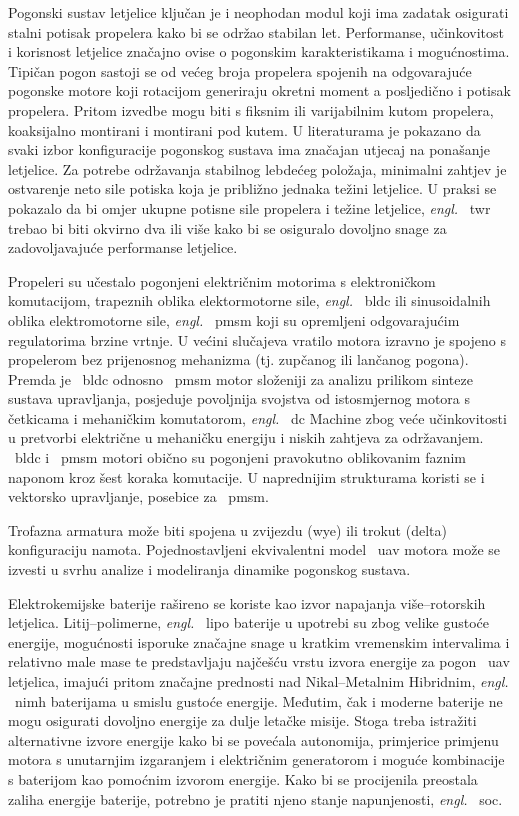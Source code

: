 \begin{prosirenisazetak}
	Pogonski sustav letjelice ključan je i neophodan modul koji ima zadatak osigurati stalni potisak propelera kako bi se održao stabilan let. Performanse, učinkovitost i korisnost letjelice značajno ovise o pogonskim karakteristikama i mogućnostima. Tipičan pogon sastoji se od većeg broja propelera spojenih na odgovarajuće pogonske motore koji rotacijom generiraju okretni moment a posljedično i potisak propelera. Pritom izvedbe mogu biti s fiksnim ili varijabilnim kutom propelera, koaksijalno montirani i montirani pod kutem. U literaturama je pokazano da svaki izbor konfiguracije pogonskog sustava ima značajan utjecaj na ponašanje letjelice. Za potrebe održavanja stabilnog lebdećeg položaja, minimalni zahtjev je ostvarenje neto sile potiska koja je približno jednaka težini letjelice. U praksi se pokazalo da bi omjer ukupne potisne sile propelera i težine letjelice, \textit{engl.} \ {twr} trebao bi biti okvirno dva ili više kako bi se osiguralo dovoljno snage za zadovoljavajuće performanse letjelice.

	Propeleri su učestalo pogonjeni električnim motorima s elektroničkom komutacijom, trapeznih oblika elektormotorne sile, \textit{engl.} \ {bldc} ili sinusoidalnih oblika elektromotorne sile, \textit{engl.} \ {pmsm} koji su opremljeni odgovarajućim regulatorima brzine vrtnje. U većini slučajeva vratilo motora izravno je spojeno s propelerom bez prijenosnog mehanizma (tj. zupčanog ili lančanog pogona). Premda je \ {bldc} odnosno \ {pmsm} motor složeniji za analizu prilikom sinteze sustava upravljanja, posjeduje povoljnija svojstva od istosmjernog motora s četkicama i mehaničkim komutatorom, \textit{engl.} \ {dc}  Machine zbog veće učinkovitosti u pretvorbi električne u mehaničku energiju i niskih zahtjeva za održavanjem. \ {bldc} i \ {pmsm} motori obično su pogonjeni pravokutno oblikovanim faznim naponom kroz šest koraka komutacije. U naprednijim strukturama koristi se i vektorsko upravljanje, posebice za \ {pmsm}.

	Trofazna armatura može biti spojena u zvijezdu (wye) ili trokut (delta) konfiguraciju namota. Pojednostavljeni ekvivalentni model \ {uav} motora može se izvesti u svrhu analize i modeliranja dinamike pogonskog sustava.

	Elektrokemijske baterije rašireno se koriste kao izvor napajanja više–rotorskih letjelica. Litij–polimerne, \textit{engl.} \ {lipo} baterije u upotrebi su zbog velike gustoće energije, mogućnosti isporuke značajne snage u kratkim vremenskim intervalima i relativno male mase te predstavljaju najčešću vrstu izvora energije za pogon \ {uav} letjelica, imajući pritom značajne prednosti nad Nikal–Metalnim Hibridnim, \textit{engl.} \ {nimh} baterijama u smislu gustoće energije. Međutim, čak i moderne baterije ne mogu osigurati dovoljno energije za dulje letačke misije. Stoga treba istražiti alternativne izvore energije kako bi se povećala autonomija, primjerice primjenu motora s unutarnjim izgaranjem i električnim generatorom i moguće kombinacije s baterijom kao pomoćnim izvorom energije. Kako bi se procijenila preostala zaliha energije baterije, potrebno je pratiti njeno stanje napunjenosti, \textit{engl.} \ {soc}.


\end{prosirenisazetak}
